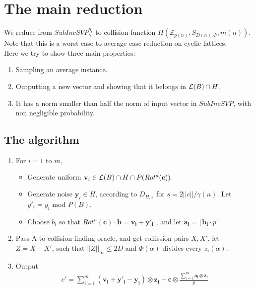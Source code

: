 \section{The main reduction}
We reduce from $SubIncSVP_\gamma^{\eta_\epsilon}$ to collision function $H(\mathbb{Z}_{p(n)} , S_{D(n),\Phi}, m(n))$. Note that this is a worst case to average case reduction on cyclic lattices.
\\
Here we try to show three main properties:
\begin{enumerate}
	\item Sampling an average instance.
	\item Outputting a new vector and showing that it belongs in $\mathcal{L}(B) \cap H$.
	\item It has a norm smaller than half the norm of input vector in $SubIncSVP$, with non negligible probability.
\end{enumerate}
\subsection{The algorithm}
\begin{enumerate}
	\item For $i = 1$ to $m$,
	\begin{itemize}
		\item Generate uniform $\mathbf{v}_i \in \mathcal{L}(B)\cap H \cap P(Rot^d(\mathbf{c}))$. \cite{Micciancio2002}
		\item Generate noise $\mathbf{y}_i \in H$, according to $D_{H,s}$ for $s = 2||c||/\gamma(n)$. Let $y'_i = y_i$ mod $P(B)$.
		\item Choose $b_i$ so that $Rot^n(\mathbf{c}) \cdot \mathbf{b} = \mathbf{v_i} + \mathbf{y'_i}$ , and let $\mathbf{a_i} = \lfloor \mathbf{b_i} \cdot p \rceil $
	\end{itemize}
	\item Pass A to collision finding oracle, and get collission pairs $X,X'$, let $Z = X - X'$, such that $||Z||_\infty \leq 2D$ and $\Phi(\alpha)$ divides every $z_i(\alpha)$.
	\item Output 
	\begin{align*}
	c' = \sum_{i=1}^m(\mathbf{v_i}+\mathbf{y'_i} - \mathbf{y_i}) \otimes \mathbf{z_i} - \mathbf{c} \otimes \frac{\sum_{i=1}^m \mathbf{a_i} \otimes \mathbf{z_i}}{p}
	\end{align*} 	
\end{enumerate}
